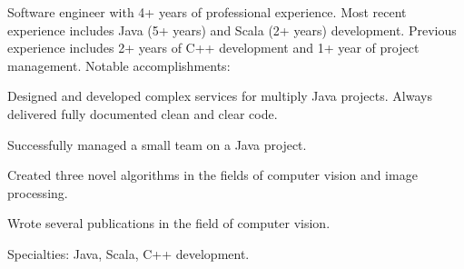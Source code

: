 

\begin{cvparagraph}
	Software engineer with 4+ years of professional experience. Most recent experience includes Java (5+ years) and Scala (2+ years) development. Previous experience includes 2+ years of C++ development and 1+ year of project management. Notable accomplishments:
      \begin{cvitems}
      \item{Designed and developed complex services for multiply Java projects. Always delivered fully documented clean and clear code.}
      \item{Successfully managed a small team on a Java project.}
      \item{Created three novel algorithms in the fields of computer vision and image processing.}
      \item{Wrote several publications in the field of computer vision.}
      \end{cvitems}
      Specialties: Java, Scala, C++ development.
\end{cvparagraph}
